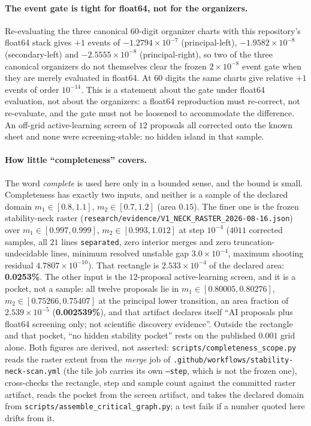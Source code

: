 \documentclass[11pt]{article}
\begin{document}
\paragraph{The event gate is tight for float64, not for the organizers.}
Re-evaluating the three canonical $60$-digit organizer charts with this
repository's float64 stack gives $+1$ events of
$-1.2794\times10^{-7}$ (principal-left),
$-1.9582\times10^{-8}$ (secondary-left) and
$-2.5555\times10^{-8}$ (principal-right), so two of the three canonical
organizers do not themselves clear the frozen $2\times10^{-8}$ event gate when
they are merely evaluated in float64.  At $60$ digits the same charts give
relative $+1$ events of order $10^{-14}$.  This is a statement about the gate
under float64 evaluation, not about the organizers: a float64 reproduction must
re-correct, not re-evaluate, and the gate must not be loosened to accommodate
the difference.
An off-grid active-learning screen of $12$ proposals all corrected onto the
known sheet and none were screening-stable: no hidden island in that sample.

\paragraph{How little ``completeness'' covers.}
The word \emph{complete} is used here only in a bounded sense, and the bound is
small.  Completeness has exactly two inputs, and neither is a sample of the
declared domain
$m_1\in[0.8,1.1]$, $m_2\in[0.7,1.2]$ (area $0.15$).
The finer one is the frozen stability-neck raster
(\texttt{research/evidence/V1\_NECK\_RASTER\_2026-08-16.json}) over
$m_1\in[0.997,0.999]$, $m_2\in[0.993,1.012]$ at step $10^{-4}$
($4011$ corrected samples, all $21$ lines \texttt{separated}, zero interior
merges and zero truncation-undecidable lines, minimum resolved unstable gap
$3.0\times10^{-4}$, maximum shooting residual $4.7807\times10^{-10}$).
That rectangle is
$2.533\times10^{-4}$ of the declared area: \textbf{0.0253\%}.
The other input is the $12$-proposal active-learning screen, and it is a
pocket, not a sample: all twelve proposals lie in
$m_1\in[0.80005,0.80276]$, $m_2\in[0.75266,0.75407]$ at the principal lower
transition, an area fraction of $2.539\times10^{-5}$
(\textbf{0.002539\%}), and that artifact declares itself ``AI proposals plus
float64 screening only; not scientific discovery evidence''.
Outside the rectangle and that pocket, ``no hidden stability pocket'' rests on
the published $0.001$ grid alone.
Both figures are derived, not asserted:
\texttt{scripts/completeness\_scope.py} reads the raster extent from the
\emph{merge} job of \texttt{.github/workflows/stability-neck-scan.yml}
(the tile job carries its own \texttt{--step}, which is not the frozen one),
cross-checks the rectangle, step and sample count against the committed raster
artifact, reads the pocket from the screen artifact, and takes the declared
domain from \texttt{scripts/assemble\_critical\_graph.py}; a test fails if a
number quoted here drifts from it.
\end{document}

